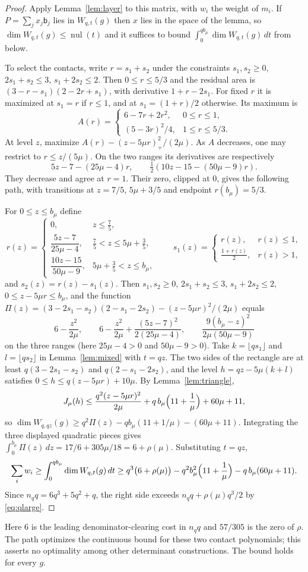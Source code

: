 \documentclass[11pt,reqno]{amsart}
\theoremstyle{definition}
\theoremstyle{remark}
\numberwithin{equation}{section}
\begin{document}
\begin{proof}
Apply Lemma~\ref{lem:layer} to this matrix, with $w_i$ the weight of $m_i$.
If $P=\sum_jx_j\mathsf b_j$ lies in $W_{q,t}(g)$ then $x$ lies in the space of the
lemma, so $\dim W_{q,t}(g)\le\operatorname{nul}(t)$ and it suffices to bound
$\int_0^{qb_\mu}\dim W_{q,t}(g)\,dt$ from below.

To select the contacts, write $r=s_1+s_2$ under the constraints
$s_1,s_2\ge0$, $2s_1+s_2\le3$, $s_1+2s_2\le2$.
Then $0\le r\le5/3$ and the residual area is
$(3-r-s_1)(2-2r+s_1)$, with derivative $1+r-2s_1$.
For fixed $r$ it is maximized at $s_1=r$ if $r\le1$, and at
$s_1=(1+r)/2$ otherwise. Its maximum is
\[
 A(r)=\begin{cases}6-7r+2r^2,&0\le r\le1,\\
 (5-3r)^2/4,&1\le r\le5/3.\end{cases}
\]
At level $z$, maximize $A(r)-(z-5\mu r)_+^2/(2\mu)$.
As $A$ decreases, one may restrict to $r\le z/(5\mu)$.
On the two ranges its derivatives are respectively
\[
 5z-7-(25\mu-4)r,\qquad
 \tfrac12(10z-15-(50\mu-9)r).
\]
They decrease and agree at $r=1$. Their zero, clipped at $0$, gives
the following path, with transitions at $z=7/5$, $5\mu+3/5$ and
endpoint $r(b_\mu)=5/3$.

For $0\le z\le b_\mu$ define
\[
 r(z)=\begin{cases}0,&z\le\frac75,\\[2pt]
 \dfrac{5z-7}{25\mu-4},&\frac75<z\le5\mu+\frac35,\\[8pt]
 \dfrac{10z-15}{50\mu-9},&5\mu+\frac35<z\le b_\mu,\end{cases}
 \qquad
 s_1(z)=\begin{cases}r(z),&r(z)\le1,\\ \frac{1+r(z)}2,&r(z)>1,\end{cases}
\]
and $s_2(z)=r(z)-s_1(z)$. Then $s_1,s_2\ge0$, $2s_1+s_2\le3$, $s_1+2s_2\le2$,
$0\le z-5\mu r\le b_\mu$, and the function
$\Pi(z)=(3-2s_1-s_2)(2-s_1-2s_2)-(z-5\mu r)^2/(2\mu)$ equals
\[
 6-\frac{z^2}{2\mu},\qquad
 6-\frac{z^2}{2\mu}+\frac{(5z-7)^2}{2(25\mu-4)},\qquad
 \frac{9(b_\mu-z)^2}{2\mu(50\mu-9)}
\]
on the three ranges (here $25\mu-4>0$ and $50\mu-9>0$).
Take $k=\lfloor qs_1\rfloor$ and $l=\lfloor qs_2\rfloor$ in
Lemma~\ref{lem:mixed} with $t=qz$. The two sides of the rectangle are at
least $q(3-2s_1-s_2)$ and $q(2-s_1-2s_2)$, and the level
$h=qz-5\mu(k+l)$ satisfies $0\le h\le q(z-5\mu r)+10\mu$. By
Lemma~\ref{lem:triangle},
\[
 J_\mu(h)\le\frac{q^2(z-5\mu r)^2}{2\mu}+q\,b_\mu\Bigl(11+\frac1\mu\Bigr)+60\mu+11,
\]
so $\dim W_{q,qz}(g)\ge q^2\Pi(z)-qb_\mu(11+1/\mu)-(60\mu+11)$. Integrating the three displayed quadratic pieces gives
$\int_0^{b_\mu}\Pi(z)\,dz=17/6+305\mu/18=6+\rho(\mu)$.
Substituting $t=qz$,
\[
 \sum_iw_i\ge\int_0^{qb_\mu}\dim W_{q,t}(g)\,dt
 \ge q^3\bigl(6+\rho(\mu)\bigr)-q^2b_\mu^2\Bigl(11+\frac1\mu\Bigr)-q\,b_\mu(60\mu+11).
\]
Since $n_qq=6q^3+5q^2+q$, the right side exceeds $n_qq+\rho(\mu)q^3/2$ by
\eqref{eq:qlarge}.
\end{proof}
Here $6$ is the leading denominator-clearing cost in $n_qq$ and
$57/305$ is the zero of $\rho$. The path optimizes the continuous bound
for these two contact polynomials; this asserts no optimality among
other determinant constructions. The bound holds for every $g$.
\end{document}
